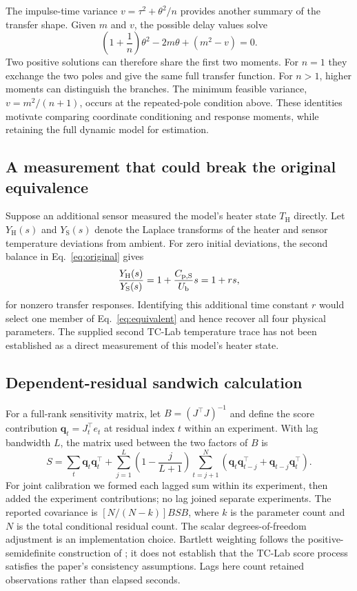 The impulse-time variance $v=\tau^2+\theta^2/n$ provides another summary of the
transfer shape. Given $m$ and $v$, the possible delay values solve
\[
 \left(1+\frac1n\right)\theta^2-2m\theta+(m^2-v)=0.
\]
Two positive solutions can therefore share the first two moments. For $n=1$
they exchange the two poles and give the same full transfer function. For
$n>1$, higher moments can distinguish the branches. The minimum feasible
variance, $v=m^2/(n+1)$, occurs at the repeated-pole condition above. These
identities motivate comparing coordinate conditioning and response moments,
while retaining the full dynamic model for estimation.

\subsection{A measurement that could break the original equivalence}
Suppose an additional sensor measured the model's heater state $T_{\mathrm H}$
directly. Let $Y_{\mathrm H}(s)$ and $Y_{\mathrm S}(s)$ denote the Laplace
transforms of the heater and sensor temperature deviations from ambient.
For zero initial deviations, the second balance in Eq.~\eqref{eq:original} gives
\[
 \frac{Y_{\mathrm H}(s)}{Y_{\mathrm S}(s)}
 =1+\frac{C_{\mathrm{p,S}}}{U_{\mathrm b}}s=1+rs,
\]
for nonzero transfer responses. Identifying this additional time constant $r$ would select one
member of Eq.~\eqref{eq:equivalent} and hence recover all four physical
parameters. The supplied
second TC-Lab temperature trace has not been established as a direct
measurement of this model's heater state.

\subsection{Dependent-residual sandwich calculation}
For a full-rank sensitivity matrix, let $B=(J^\top J)^{-1}$ and define the
score contribution $\bm q_t=J_t^\top e_t$ at residual index $t$ within an
experiment. With lag bandwidth $L$, the matrix used between the two factors
of $B$ is
\[
 S=\sum_t\bm q_t\bm q_t^\top+
 \sum_{j=1}^{L}\left(1-\frac{j}{L+1}\right)
 \sum_{t=j+1}^{N}
 \left(\bm q_t\bm q_{t-j}^\top+\bm q_{t-j}\bm q_t^\top\right).
\]
For joint calibration we formed each lagged sum within its experiment, then
added the experiment contributions; no lag joined separate experiments. The
reported covariance is $[N/(N-k)]BSB$, where $k$ is the parameter count and
$N$ is the total conditional residual count. The scalar degrees-of-freedom
adjustment is an implementation choice. Bartlett weighting follows the
positive-semidefinite construction of \citet{newey-1987-simple}; it does not
establish that the TC-Lab score process satisfies the paper's consistency
assumptions. Lags here count retained observations rather than elapsed seconds.
